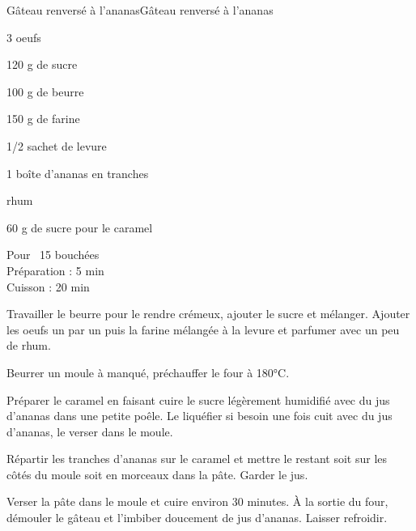 \begin{recette}{Gâteau renversé à l'ananas}{Gâteau renversé à l'ananas}

\begin{ingredients}
3 oeufs\par
120 g de sucre\par
100 g de beurre\par
150 g de farine\par
1/2 sachet de levure\par
1 boîte d'ananas en tranches\par
rhum\par
60 g de sucre pour le caramel\par
\end{ingredients}

\begin{infos}
Pour ~15 bouchées\\
Préparation : 5 min\\
Cuisson : 20 min\\
\end{infos}

\begin{etapes}
\item Travailler le beurre pour le rendre crémeux, ajouter le sucre et mélanger. Ajouter les oeufs un par un puis la farine mélangée à la levure et parfumer avec un peu de rhum.
\item Beurrer un moule à manqué, préchauffer le four à 180°C.
\item Préparer le caramel en faisant cuire le sucre légèrement humidifié avec du jus d'ananas dans une petite poêle. Le liquéfier si besoin une fois cuit avec du jus d'ananas, le verser dans le moule.
\item Répartir les tranches d'ananas sur le caramel et mettre le restant soit sur les côtés du moule soit en morceaux dans la pâte. Garder le jus.
\item Verser la pâte dans le moule et cuire environ 30 minutes. À la sortie du four, démouler le gâteau et l'imbiber doucement de jus d'ananas. Laisser refroidir.
\end{etapes}

\begin{conseils}
\end{conseils}

\end{recette}